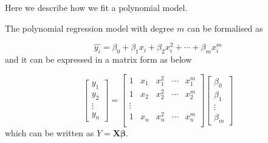 Here we describe how we fit a polynomial model.

The polynomial regression model with degree $m$ can be formalised as 

$$ \hat{y_i}= \beta_0+\beta_1x_i+\beta_2x_i^2+\cdots+\beta_mx_i^m$$ and it can be expressed in a matrix form as below

$$
\begin{bmatrix}
y_1 \\ y_2\\ \vdots \\ y_n 
\end{bmatrix}=\begin{bmatrix}
1 & x_1 & x_1^2 &\cdots & x_1^m \\ 
1 & x_2 & x_2^2 &\cdots & x_2^m \\ 
\vdots \\ 
1 & x_n & x_n^2 &\cdots & x_n^m \\ 
\end{bmatrix}\begin{bmatrix}
\beta_0 \\ \beta_1 \\ \vdots \\ \beta_m 
\end{bmatrix}
$$ which can be written as $Y=\boldsymbol{X}\boldsymbol{\beta}$. 
 
